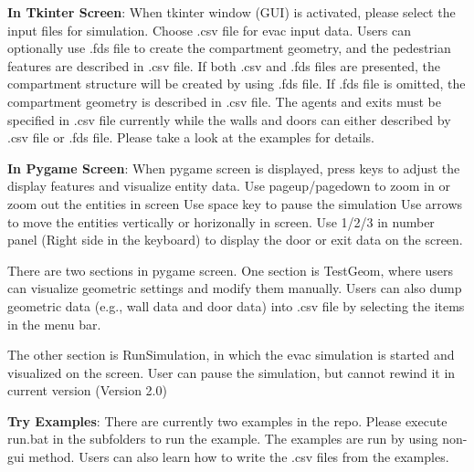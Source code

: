 \documentclass{article}
\begin{document}
\textbf{In Tkinter Screen}: When tkinter window (GUI) is activated, please select the input files for simulation.  Choose .csv file for evac input data.  Users can optionally use .fds file to create the compartment geometry, and the pedestrian features are described in .csv file.  If both .csv and .fds files are presented, the compartment structure will be created by using .fds file.  If .fds file is omitted, the compartment geometry is described in .csv file.  The agents and exits must be specified in .csv file currently while the walls and doors can either described by .csv file or .fds file.  Please take a look at the examples for details.

\textbf{In Pygame Screen}: When pygame screen is displayed, press keys to adjust the display features and visualize entity data.
Use pageup/pagedown to zoom in or zoom out the entities in screen
Use space key to pause the simulation
Use arrows to move the entities vertically or horizonally in screen.
Use 1/2/3 in number panel (Right side in the keyboard) to display the door or exit data on the screen.

There are two sections in pygame screen.
One section is TestGeom, where users can visualize geometric settings and modify them manually.  Users can also dump geometric data (e.g., wall data and door data) into .csv file by selecting the items in the menu bar.

The other section is RunSimulation, in which the evac simulation is started and visualized on the screen.  User can pause the simulation, but cannot rewind it in current version (Version 2.0)

\textbf{Try Examples}: There are currently two examples in the repo.  Please execute run.bat in the subfolders to run the example.  The examples are run by using non-gui method.  Users can also learn how to write the .csv files from the examples.
\end{document}
